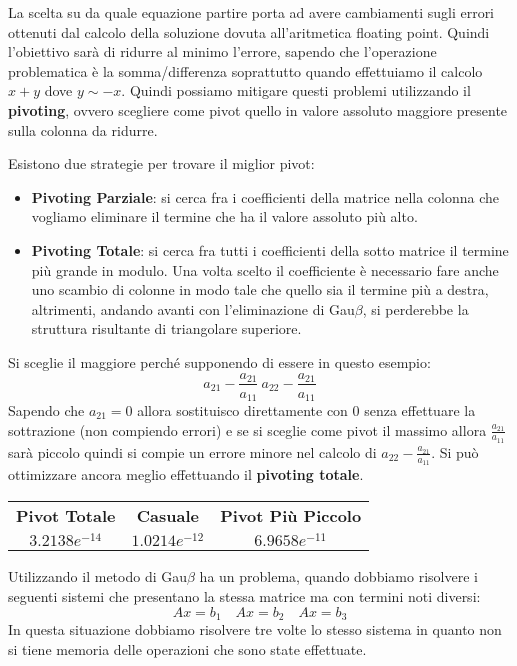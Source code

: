 La scelta su da quale equazione partire porta ad avere cambiamenti sugli errori
ottenuti dal calcolo della soluzione dovuta all'aritmetica floating point. Quindi
l'obiettivo sarà di ridurre al minimo l'errore, sapendo che l'operazione problematica
è la somma/differenza soprattutto quando effettuiamo il calcolo $x + y$ dove $y
    \sim -x$. Quindi possiamo mitigare questi problemi utilizzando il \textbf{pivoting},
ovvero scegliere come pivot quello in valore assoluto maggiore presente sulla
colonna da ridurre.

Esistono due strategie per trovare il miglior pivot:
\begin{itemize}
    \item \textbf{Pivoting Parziale}: si cerca fra i coefficienti della matrice
          nella colonna che vogliamo eliminare il termine che ha il valore
          assoluto più alto.
    \item \textbf{Pivoting Totale}:  si cerca fra tutti i coefficienti della
          sotto matrice il termine più grande in modulo. Una volta scelto il
          coefficiente è necessario fare anche uno scambio di colonne in modo
          tale che quello sia il termine più a destra, altrimenti, andando
          avanti con l'eliminazione di Gau$\beta$, si perderebbe la struttura
          risultante di triangolare superiore.
\end{itemize}

Si sceglie il maggiore perché supponendo di essere in questo esempio:
$$a_{21} - \frac{a_{21}}{a_11} \ a_{22}-\frac{a_{21}}{a_11}$$
Sapendo che $a_{21}=0$ allora sostituisco direttamente con $0$ senza effettuare
la sottrazione (non compiendo errori) e se si sceglie come pivot il massimo allora
$\frac{a_{21}}{a_11}$ sarà piccolo quindi si compie un errore minore nel calcolo
di $a_{22}-\frac{a_{21}}{a_11}$. Si può ottimizzare ancora meglio effettuando il
\textbf{pivoting totale}.
\begin{table}[!ht]
    \centering
    \begin{tabular}{|c|c|c|}
        \hline
        \textbf{Pivot Totale} & \textbf{Casuale} & \textbf{Pivot Più Piccolo} \\
        $3.2138 e^{-14}$      & $1.0214 e^{-12}$ & $6.9658 e^{-11}$           \\
        \hline
    \end{tabular}
\end{table}

Utilizzando il metodo di Gau$\beta$ ha un problema, quando dobbiamo risolvere i
seguenti sistemi che presentano la stessa matrice ma con termini noti diversi:
\begin{equation*}
    Ax=b_1 \quad Ax=b_2 \quad Ax=b_3
\end{equation*}
In questa situazione dobbiamo risolvere tre volte lo stesso sistema in quanto
non si tiene memoria delle operazioni che sono state effettuate.

